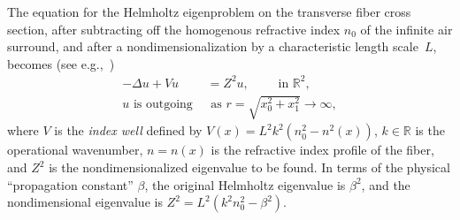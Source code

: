\documentclass[12pt, oneside, reqno]{amsart}
\theoremstyle{remark}
\begin{document}
The equation for the Helmholtz eigenproblem on the transverse fiber
cross section, after subtracting off the homogenous refractive index
$n_0$ of the infinite air surround, and after a nondimensionalization
by a characteristic length scale~$L$, becomes (see
e.g.,~\cite[Eq.~(21a--b)]{GopParVan2022-1})
\begin{equation}
  \label{eq:before-pml}
\begin{aligned}
  - \Delta u + V u & = Z^2 u, \qquad \text{ in } \mathbb{R}^2, \\
  u \text{ is outgoing } & \text{ as } r = \sqrt{x_0^2 + x_1^2} \to \infty,
\end{aligned}  
\end{equation}
where \(V\) is the \emph{index well} defined by
\(V(x) = L^2 k^2 (n_0^2 - n^2(x))\), \(k\in \mathbb{R}\) is the
operational wavenumber, \(n = n(x)\) is the refractive index profile
of the
fiber, %
and \(Z^2\) is the nondimensionalized eigenvalue to be found.  In
terms of the physical ``propagation constant'' $\beta$, 
the original Helmholtz eigenvalue is  $\beta^2$, and  the nondimensional eigenvalue
is $Z^2 = L^2 (k^2 n_0^2 - \beta^2)$.
\end{document}
